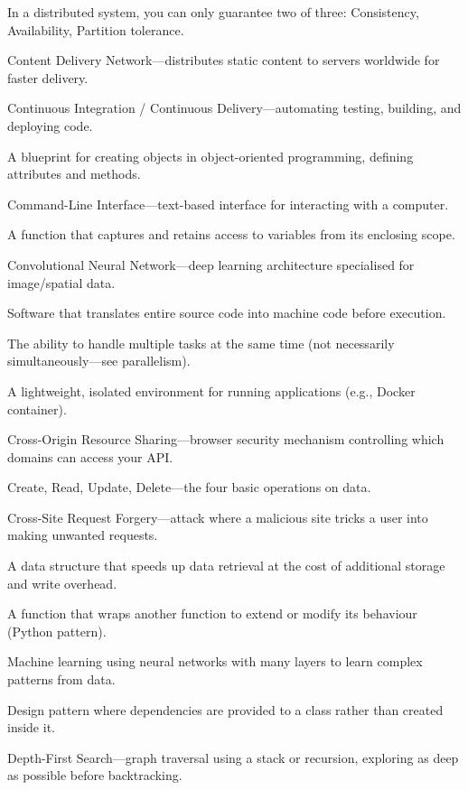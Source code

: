 \documentclass[12pt, a4paper, oneside]{book}
\begin{document}
\begin{description}[leftmargin=2em, style=nextline]
    \item[CAP Theorem] In a distributed system, you can only guarantee two of three: Consistency, Availability, Partition tolerance.
    \item[CDN] Content Delivery Network---distributes static content to servers worldwide for faster delivery.
    \item[CI/CD] Continuous Integration / Continuous Delivery---automating testing, building, and deploying code.
    \item[Class] A blueprint for creating objects in object-oriented programming, defining attributes and methods.
    \item[CLI] Command-Line Interface---text-based interface for interacting with a computer.
    \item[Closure] A function that captures and retains access to variables from its enclosing scope.
    \item[CNN] Convolutional Neural Network---deep learning architecture specialised for image/spatial data.
    \item[Compiler] Software that translates entire source code into machine code before execution.
    \item[Concurrency] The ability to handle multiple tasks at the same time (not necessarily simultaneously---see parallelism).
    \item[Container] A lightweight, isolated environment for running applications (e.g., Docker container).
    \item[CORS] Cross-Origin Resource Sharing---browser security mechanism controlling which domains can access your API.
    \item[CRUD] Create, Read, Update, Delete---the four basic operations on data.
    \item[CSRF] Cross-Site Request Forgery---attack where a malicious site tricks a user into making unwanted requests.
    \item[Database Index] A data structure that speeds up data retrieval at the cost of additional storage and write overhead.
    \item[Decorator] A function that wraps another function to extend or modify its behaviour (Python pattern).
    \item[Deep Learning] Machine learning using neural networks with many layers to learn complex patterns from data.
    \item[Dependency Injection] Design pattern where dependencies are provided to a class rather than created inside it.
    \item[DFS] Depth-First Search---graph traversal using a stack or recursion, exploring as deep as possible before backtracking.

\end{description}
\end{document}
